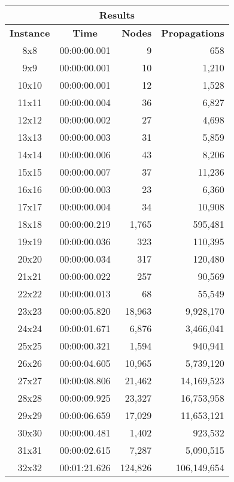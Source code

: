 
\begin{center}
    \begin{tabular}{|c|c|r|r|}
        \hline
        \multicolumn{4}{|c|}{\textbf{Results}} \\
        \hline
        \textbf{Instance} & \textbf{Time} & \textbf{Nodes} & \textbf{Propagations} \\
        
        \hline
		8x8 & 00:00:00.001 & 9 & 658 \\ \hline
		9x9 & 00:00:00.001 & 10 & 1,210 \\ \hline
		10x10 & 00:00:00.001 & 12 & 1,528 \\ \hline
		11x11 & 00:00:00.004 & 36 & 6,827 \\ \hline
		12x12 & 00:00:00.002 & 27 & 4,698 \\ \hline
		13x13 & 00:00:00.003 & 31 & 5,859 \\ \hline
		14x14 & 00:00:00.006 & 43 & 8,206 \\ \hline
		15x15 & 00:00:00.007 & 37 & 11,236 \\ \hline
		16x16 & 00:00:00.003 & 23 & 6,360 \\ \hline
		17x17 & 00:00:00.004 & 34 & 10,908 \\ \hline
		18x18 & 00:00:00.219 & 1,765 & 595,481 \\ \hline
		19x19 & 00:00:00.036 & 323 & 110,395 \\ \hline
		20x20 & 00:00:00.034 & 317 & 120,480 \\ \hline
		21x21 & 00:00:00.022 & 257 & 90,569 \\ \hline
		22x22 & 00:00:00.013 & 68 & 55,549 \\ \hline
		23x23 & 00:00:05.820 & 18,963 & 9,928,170 \\ \hline
		24x24 & 00:00:01.671 & 6,876 & 3,466,041 \\ \hline
		25x25 & 00:00:00.321 & 1,594 & 940,941 \\ \hline
		26x26 & 00:00:04.605 & 10,965 & 5,739,120 \\ \hline
		27x27 & 00:00:08.806 & 21,462 & 14,169,523 \\ \hline
		28x28 & 00:00:09.925 & 23,327 & 16,753,958 \\ \hline
		29x29 & 00:00:06.659 & 17,029 & 11,653,121 \\ \hline
		30x30 & 00:00:00.481 & 1,402 & 923,532 \\ \hline
		31x31 & 00:00:02.615 & 7,287 & 5,090,515 \\ \hline
		32x32 & 00:01:21.626 & 124,826 & 106,149,654 \\ \hline

\end{tabular}
\end{center}
